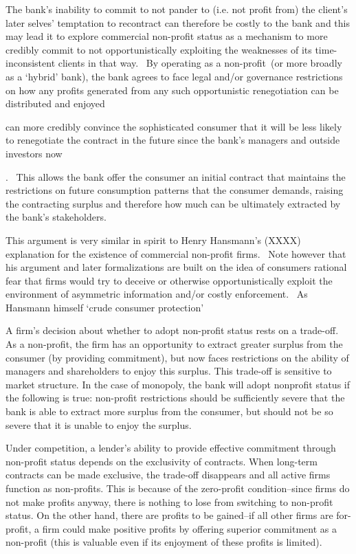 \documentclass[11pt]{article}%
\begin{document}
The bank's inability to commit to not pander to (i.e. not  profit
from) the client's later selves' temptation to recontract can therefore be
costly to the bank and this may lead it to explore commercial non-profit
status as a mechanism to more credibly commit to not opportunistically
exploiting the weaknesses of its time-inconsistent clients in that way. \ By
operating as a non-profit\ (or more broadly as a `hybrid' bank), the bank
agrees to face legal and/or governance restrictions on how any profits
generated from any such opportunistic renegotiation can be distributed and enjoyed

can more credibly convince the sophisticated consumer that it will be less
likely to renegotiate the contract in the future since the bank's managers and
outside investors now

. \ This allows the bank offer the consumer an initial contract that maintains
the restrictions on future consumption patterns that the consumer demands,
raising the contracting surplus and therefore how much can be ultimately
extracted by the bank's stakeholders. \ 

This argument is very similar in spirit to Henry Hansmann's (XXXX) explanation
for the existence of commercial non-profit firms. \ Note however that his
argument and later formalizations are built on the idea of consumers rational
fear that firms would try to deceive or otherwise opportunistically exploit
the environment of asymmetric information and/or costly enforcement. \ As
Hansmann himself `crude consumer protection'

A firm's decision about whether to adopt non-profit status rests on a
trade-off. As a non-profit, the firm has an opportunity to extract greater
surplus from the consumer (by providing commitment), but now faces
restrictions on the ability of managers and shareholders to enjoy this
surplus. This trade-off is sensitive to market structure. In the case of
monopoly, the bank will adopt nonprofit status if the following is true:
non-profit restrictions should be sufficiently severe that the bank is able to
extract more surplus from the consumer, but should not be so severe that it is
unable to enjoy the surplus.

Under competition, a lender's ability to provide effective commitment through
non-profit status depends on the exclusivity of contracts. When long-term
contracts can be made exclusive, the trade-off disappears and all active firms
function as non-profits. This is because of the zero-profit condition--since
firms do not make profits anyway, there is nothing to lose from switching to
non-profit status. On the other hand, there are profits to be gained--if all
other firms are for-profit, a firm could make positive profits by offering
superior commitment as a non-profit (this is valuable even if its enjoyment of
these profits is limited).
\end{document}
